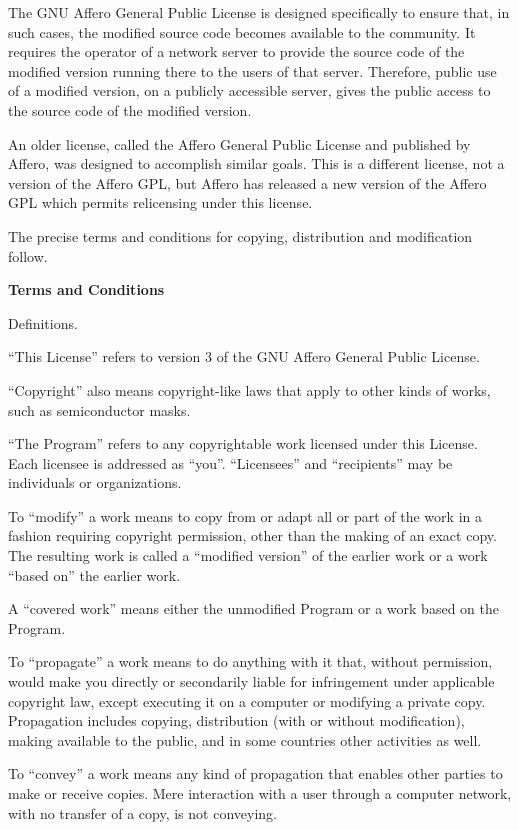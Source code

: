 The GNU Affero General Public License is designed specifically to ensure that, in such cases, the modified source code becomes available to the community.  It requires the operator of a network server to provide the source code of the modified version running there to the users of that server.  Therefore, public use of a modified version, on a publicly accessible server, gives the public access to the source code of the modified version.

An older license, called the Affero General Public License and published by Affero, was designed to accomplish similar goals.  This is a different license, not a version of the Affero GPL, but Affero has released a new version of the Affero GPL which permits relicensing under this license.

The precise terms and conditions for copying, distribution and modification follow.

{\bf Terms and Conditions}
\startitemize[n][start=0]

\item Definitions.

``This License'' refers to version 3 of the GNU Affero General Public License.

``Copyright'' also means copyright-like laws that apply to other kinds of works, such as semiconductor masks.

``The Program'' refers to any copyrightable work licensed under this License.  Each licensee is addressed as ``you''.  ``Licensees'' and ``recipients'' may be individuals or organizations.

To ``modify'' a work means to copy from or adapt all or part of the work in a fashion requiring copyright permission, other than the making of an exact copy.  The resulting work is called a ``modified version'' of the earlier work or a work ``based on'' the earlier work.

A ``covered work'' means either the unmodified Program or a work based on the Program.

To ``propagate'' a work means to do anything with it that, without permission, would make you directly or secondarily liable for infringement under applicable copyright law, except executing it on a computer or modifying a private copy.  Propagation includes copying, distribution (with or without modification), making available to the public, and in some countries other activities as well.

To ``convey'' a work means any kind of propagation that enables other parties to make or receive copies.  Mere interaction with a user through a computer network, with no transfer of a copy, is not conveying.

